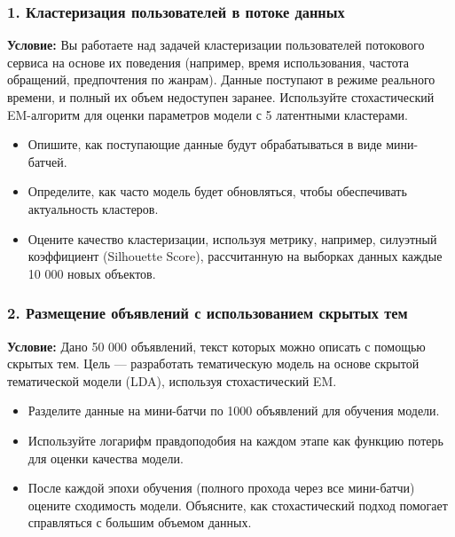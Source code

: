 \subsubsection*{1. Кластеризация пользователей в потоке данных}
\textbf{Условие:} Вы работаете над задачей кластеризации пользователей потокового сервиса на основе их поведения (например, время использования, частота обращений, предпочтения по жанрам). Данные поступают в режиме реального времени, и полный их объем недоступен заранее. Используйте стохастический EM-алгоритм для оценки параметров модели с 5 латентными кластерами.
\begin{itemize}
\item Опишите, как поступающие данные будут обрабатываться в виде мини-батчей.
\item Определите, как часто модель будет обновляться, чтобы обеспечивать актуальность кластеров.
\item Оцените качество кластеризации, используя метрику, например, силуэтный коэффициент (Silhouette Score), рассчитанную на выборках данных каждые 10 000 новых объектов.
\end{itemize}

\subsubsection*{2. Размещение объявлений с использованием скрытых тем}
\textbf{Условие:} Дано 50 000 объявлений, текст которых можно описать с помощью скрытых тем. Цель — разработать тематическую модель на основе скрытой тематической модели (LDA), используя стохастический EM.
\begin{itemize}
\item Разделите данные на мини-батчи по 1000 объявлений для обучения модели.
\item Используйте логарифм правдоподобия на каждом этапе как функцию потерь для оценки качества модели.
\item После каждой эпохи обучения (полного прохода через все мини-батчи) оцените сходимость модели. Объясните, как стохастический подход помогает справляться с большим объемом данных.
\end{itemize}

